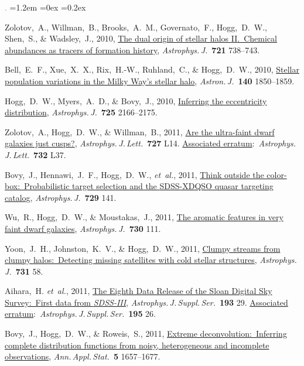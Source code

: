 \documentclass[10pt,letterpaper]{article}
\newcommand{\acronym}[1]{{\small{#1}}}
\newcommand{\foreign}[1]{\textsl{#1}}
\newcommand{\etal}{\foreign{et~al.}}
\newcommand{\project}[1]{\textsl{#1}}
\newcommand{\doi}[2]{\href{http://dx.doi.org/#1}{{#2}}}
\newcommand{\deemph}[1]{\textcolor{grey}{\footnotesize{#1}}}
\newcommand{\pubnumber}[1]{\deemph{{#1}.}}
\newcounter{refpubnum}
\newcommand{\hogglist}{%
    \rightmargin=0in
    \leftmargin=1.2em
    \topsep=0ex
    \partopsep=0pt
    \itemsep=0.2ex
    \parsep=0pt
    \itemindent=-1.0\leftmargin
    \listparindent=0.0\leftmargin
    \settowidth{\labelsep}{~}
    \usecounter{refpubnum}
  }
\begin{document}
\begin{list}{\pubnumber{\therefpubnum}}{\hogglist}
\item
Zolotov,~A., Willman,~B., Brooks,~A.~M., Governato,~F., Hogg,~D.~W., Shen,~S., \& Wadsley,~J., 2010,
\doi{10.1088/0004-637X/721/1/738}{The dual origin of stellar halos \acronym{II}.\ Chemical abundances as tracers of formation history},
\textit{Astrophys.\,J.}\ \textbf{721} 738--743.
\item
Bell,~E.~F., Xue,~X.~X., Rix,~H.-W., Ruhland,~C., \& Hogg,~D.~W., 2010,
\doi{10.1088/0004-6256/140/6/1850}{Stellar population variations in the Milky Way's stellar halo},
\textit{Astron.\,J.}\ \textbf{140} 1850--1859.
\item
Hogg,~D.~W., Myers,~A.~D., \& Bovy,~J., 2010,
\doi{10.1088/0004-637X/725/2/2166}{Inferring the eccentricity distribution},
\textit{Astrophys.\,J.}\ \textbf{725} 2166--2175.
\item
Zolotov,~A., Hogg,~D.~W., \& Willman,~B., 2011,
\doi{10.1088/2041-8205/727/1/L14}{Are the ultra-faint dwarf galaxies just cusps?},
\textit{Astrophys.\,J.\,Lett.}\ \textbf{727} L14.
\doi{10.1088/2041-8205/732/2/L37}{Associated erratum}:\ \textit{Astrophys.\,J.\,Lett.}\ \textbf{732} L37.
\item
Bovy,~J., Hennawi,~J.~F., Hogg,~D.~W., \etal, 2011,
\doi{10.1088/0004-637X/729/2/141}{Think outside the color-box:\ Probabilistic target selection and the \acronym{SDSS-XDQSO} quasar targeting catalog},
\textit{Astrophys.\,J.}\ \textbf{729} 141.
\item
Wu,~R., Hogg,~D.~W., \& Moustakas,~J., 2011,
\doi{10.1088/0004-637X/730/2/111}{The aromatic features in very faint dwarf galaxies},
\textit{Astrophys.\,J.}\ \textbf{730} 111.
\item
Yoon,~J.~H., Johnston,~K.~V., \& Hogg,~D.~W., 2011,
\doi{10.1088/0004-637X/731/1/58}{Clumpy streams from clumpy halos:\ Detecting missing satellites with cold stellar structures}, 
\textit{Astrophys.\,J.}\ \textbf{731} 58.
\item
Aihara,~H. \etal, 2011,
\doi{10.1088/0067-0049/193/2/29}{The Eighth Data Release of the Sloan Digital Sky Survey:\ First data from \project{\acronym{SDSS-III}}},
\textit{Astrophys.\,J.\,Suppl.\,Ser.}\ \textbf{193} 29.
\doi{10.1088/0067-0049/195/2/26}{Associated erratum}:\ \textit{Astrophys.\,J.\,Suppl.\,Ser.}\ \textbf{195} 26.
\item
Bovy,~J., Hogg,~D.~W., \& Roweis,~S., 2011,
\doi{10.1214/10-AOAS439}{Extreme deconvolution:\ Inferring complete distribution functions from noisy, heterogeneous and incomplete observations},
\textit{Ann.\,Appl.\,Stat.}\ \textbf{5} 1657--1677.
\item

\end{list}
\end{document}
